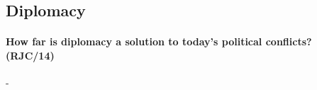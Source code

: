 \documentclass[../../main]{subfiles}
\begin{document}
\subsection{Diplomacy}

\paragraph{How far is diplomacy a solution to today's political conflicts? (RJC/14)}-
\end{document}
